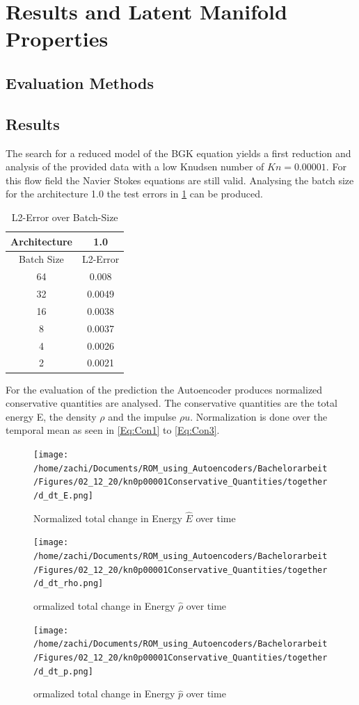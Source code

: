 \documentclass[12pt, a4paper]{article}
\begin{document}
\section{Results and Latent Manifold Properties}
\subsection{Evaluation Methods}

\subsection{Results}
The search for a reduced model of the BGK equation yields a first reduction and analysis of the provided data with a low Knudsen number of $Kn = 0.00001$. For this flow field the Navier Stokes equations are still valid.
Analysing the batch size for the architecture 1.0 the test errors in \cref{Tab:Batch} can be produced.
\begin{table}[!htbp]\centering
	\begin{tabular}{ |c c| }
		\hline
		Architecture & 1.0  \\ [.5ex]
		\hline
		Batch Size & L2-Error \\ \hline
		64 & 0.008  \\ 
		32 & 0.0049\\ \hline
		16 & 0.0038\\ \hline
		8 & 0.0037\\ \hline
		4 & 0.0026\\ \hline
		2 & 0.0021\\
		 \hline
	\end{tabular}
\caption{L2-Error over Batch-Size}
\label{Tab:Batch}
\end{table}
For the evaluation of the prediction the Autoencoder produces normalized conservative quantities are analysed. The conservative quantities are the total energy E, the density $\rho$ and the impulse $\rho u$. Normalization is done over the temporal mean as seen in \cref{Eq:Con1} to \cref{Eq:Con3}.
\begin{figure}[!htbp]
\texttt{[image: /home/zachi/Documents/ROM\_using\_Autoencoders/Bachelorarbeit/Figures/02\_12\_20/kn0p00001Conservative\_Quantities/together/d\_dt\_E.png]}
\caption{Normalized total change in Energy $\hat{E}$ over time }\label{fig:awesome_image1}
\endminipage\hfill
{}
\texttt{[image: /home/zachi/Documents/ROM\_using\_Autoencoders/Bachelorarbeit/Figures/02\_12\_20/kn0p00001Conservative\_Quantities/together/d\_dt\_rho.png]}
\caption{ormalized total change in Energy $\hat{\rho}$ over time}\label{fig:awesome_image2}
\endminipage\hfill
{}%
\texttt{[image: /home/zachi/Documents/ROM\_using\_Autoencoders/Bachelorarbeit/Figures/02\_12\_20/kn0p00001Conservative\_Quantities/together/d\_dt\_p.png]}
\caption{ormalized total change in Energy $\hat{p}$ over time}\label{fig:awesome_image3}
\endminipage
\end{figure}
\end{document}
